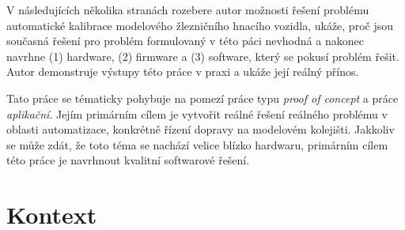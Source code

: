 V následujících několika stranách rozebere autor možnosti řešení problému
automatické kalibrace modelového žlezničního hnacího vozidla, ukáže, proč
jsou současná řešení pro problém formulovaný v této páci nevhodná a nakonec
navrhne (1) hardware, (2) firmware a (3) software, který se pokusí problém
řešit. Autor demonstruje výstupy této práce v praxi a ukáže její reálný
přínos.

Tato práce se tématicky pohybuje na pomezí práce typu \textit{proof of concept}
a práce \textit{aplikační}. Jejím primárním cílem je vytvořit reálné řešení
reálného problému v oblasti automatizace, konkrétně řízení dopravy na modelovém
kolejišti. Jakkoliv se může zdát, že toto téma se nachází velice blízko
hardwaru, primárním cílem této práce je navrhnout kvalitní softwarové řešení.

\section{Kontext }
